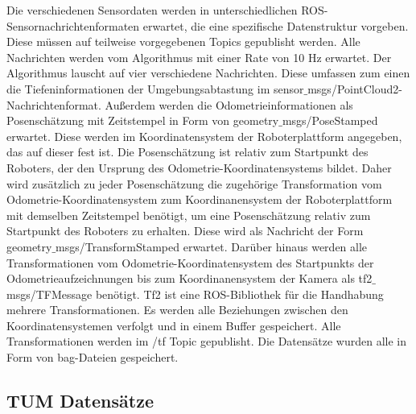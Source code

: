 Die verschiedenen Sensordaten werden in unterschiedlichen ROS-Sen\-sor\-nach\-rich\-ten\-for\-ma\-ten erwartet, die eine spezifische Datenstruktur vorgeben. Diese müssen auf teilweise vorgegebenen Topics gepublisht werden. 
Alle Nachrichten werden vom Algorithmus mit einer Rate von 10 Hz erwartet. Der Algorithmus lauscht auf vier verschiedene Nachrichten. Diese umfassen zum einen die Tiefeninformationen der Umgebungsabtastung im  sensor$\_$msgs/PointCloud2-Nachrichtenformat. Außerdem werden die Odometrieinformationen als Posenschätzung mit Zeitstempel in Form von geometry$\_$msgs/PoseStamped erwartet. Diese werden im Koordinatensystem der Roboterplattform angegeben, das auf dieser fest ist. Die Posenschätzung ist relativ zum Startpunkt des  Roboters, der den Ursprung des Odometrie-Koordinatensystems bildet. Daher wird zusätzlich zu jeder Posenschätzung die zugehörige Transformation vom Odometrie-Koordinatensystem zum Koordinanensystem der Roboterplattform mit demselben Zeitstempel benötigt, um eine Posenschätzung relativ zum Startpunkt des Roboters zu erhalten. Diese wird als Nachricht der Form geometry$\_$msgs/TransformStamped erwartet. Darüber hinaus werden alle Transformationen vom Odometrie-Ko\-or\-di\-na\-ten\-sys\-tem des Startpunkts der Odometrieaufzeichnungen bis zum Koordinanensystem der Kamera als tf2$\_$msgs/TFMessage benötigt. Tf2 ist eine ROS-Bibliothek für die Handhabung mehrere Transformationen. Es werden alle Beziehungen zwischen den Koordinatensystemen verfolgt und in einem Buffer ge\-spei\-chert. Alle Transformationen werden im /tf Topic gepublisht. Die Datensätze wurden alle in Form von bag-Dateien gespeichert. 

\subsection[TUM Datensatz (Schmelzer)]{TUM Datensätze}

